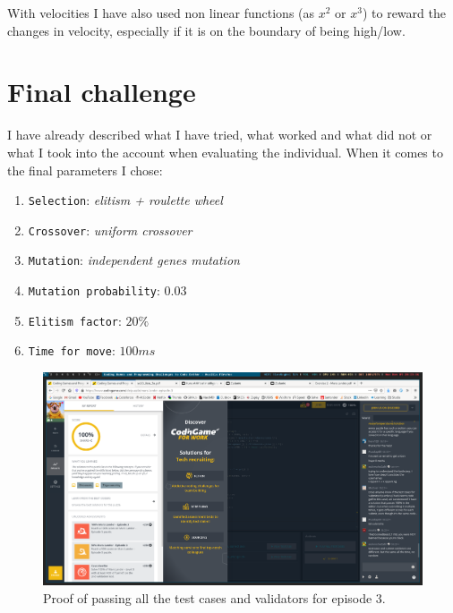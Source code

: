\documentclass[11pt]{article}
\begin{document}
	With velocities I have also used non linear functions (as $x^2$ or $x^3$) to reward the changes in velocity, especially if it is on the boundary of being high/low.
	
	\section{Final challenge}
	I have already described what I have tried, what worked and what did not or what I took into the account when evaluating the individual. When it comes to the final parameters I chose:
	\begin{enumerate}
		\item[] \texttt{Selection}: \textit{elitism + roulette wheel}
		\item[] \texttt{Crossover}: \textit{uniform crossover}
		\item[] \texttt{Mutation}: \textit{independent genes mutation}
		\item[] \texttt{Mutation probability}: $0.03$
		\item[] \texttt{Elitism factor}: $20\%$
		\item[] \texttt{Time for move}: $100ms$
	\end{enumerate}
	
	 \begin{figure}[h]
 	\centering
	\includegraphics[scale=0.3]{screens/mars-lander-episode3} 	
	\caption{Proof of passing all the test cases and validators for episode 3.}
 	\end{figure}
 	
\end{document}
